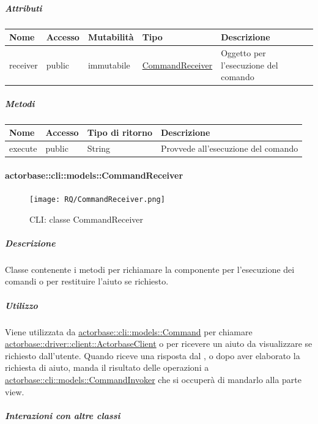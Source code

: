 \documentclass{scalatekids-article}
\begin{document}
\subparagraph{Attributi}

\begin{tabular}{| p{1cm} | p{1.5cm} | p{2cm} | p{4cm} | p{8.5cm} |}
  \hline
  Nome & Accesso & Mutabilità & Tipo & Descrizione\\
  \hline
  receiver & public & immutabile & \hyperref[sec:actorbase::cli::models::CommandReceiver]{CommandReceiver} & Oggetto per l'esecuzione del comando\\
  \hline
\end{tabular}

\subparagraph{Metodi}

\begin{tabular}{| l | l | l | l |}
  \hline
  Nome & Accesso & Tipo di ritorno & Descrizione\\
  \hline
  execute & public & String & Provvede all'esecuzione del comando\\
  \hline
\end{tabular}

\paragraph{actorbase::cli::models::CommandReceiver}
\label{sec:actorbase::cli::models::CommandReceiver}

\begin{figure}[H]
  \begin{center}
    \texttt{[image: RQ/CommandReceiver.png]}
    \caption{CLI: classe CommandReceiver}
  \end{center}
\end{figure}

\subparagraph{Descrizione}

Classe contenente i metodi per richiamare la componente  per
l'esecuzione dei comandi o per restituire l'aiuto se richiesto.

\subparagraph{Utilizzo}

Viene utilizzata da \hyperref[sec:actorbase::cli::models::Command]{actorbase::cli::models::Command} per chiamare
\hyperref[sec:actorbase::driver::client::ActorbaseClient]{actorbase::driver::client::ActorbaseClient} o per ricevere un aiuto da
visualizzare se richiesto dall'utente. Quando riceve una risposta dal , o dopo aver elaborato la richiesta
di aiuto, manda il risultato delle operazioni a \hyperref[sec:actorbase::cli::models::CommandInvoker]{actorbase::cli::models::CommandInvoker}
che si occuperà di mandarlo alla parte view.

\subparagraph{Interazioni con altre classi}
\end{document}

